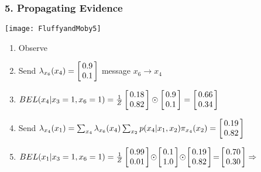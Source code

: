 \begin{frame}
\frametitle{5. Propagating Evidence}

\phantom{.} \hfill \texttt{[image: FluffyandMoby5]}

\vspace*{-12ex}
\begin{enumerate}
\addtocounter{enumi}{7}
\item Observe 
\vspace*{-2ex}
\item  Send $\lambda_{x_6}(x_4) = \left[ \!\!\begin{array}{c} 0.9 \\ 0.1 \end{array} \!\!\right]$  message $x_6
  \rightarrow x_4$
\vspace*{-2ex}
\item $BEL(x_4|x_3=1,x_6=1) = \frac{1}{Z} \vectr{0.18}{0.82} \odot
  \vectr{0.9}{0.1} = \vectr{0.66}{0.34}$
\vspace*{-2ex}
\item  Send $\lambda_{x_4}(x_1) = \sum_{x_4}   \lambda_{x_6}(x_4) \sum_{x_2}
  p(x_4|x_1,x_2) \pi_{x_4}(x_2) = \left[ \!\!\begin{array}{c} 0.19 \\ 0.82 \end{array} \!\!\right]$
\vspace*{-2ex}
\item $BEL(x_1|x_3=1,x_6=1)=\frac{1}{Z} \vectr{0.99}{0.01} \!\odot\!
  \vectr{0.1}{1.0} \!\odot\! \vectr{0.19}{0.82} \!=\! \vectr{0.70}{0.30} \Rightarrow$
\end{enumerate}

\end{frame}
